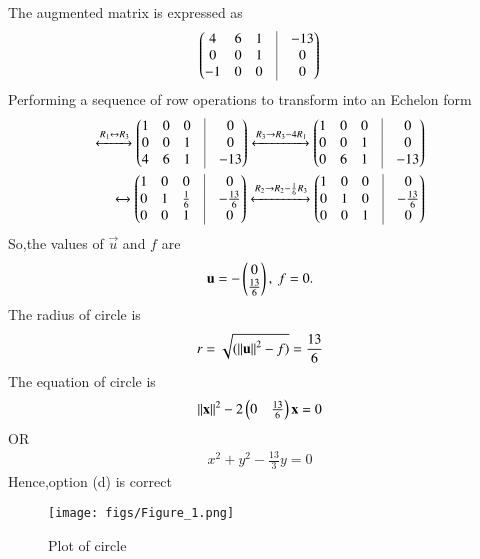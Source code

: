\documentclass[journal]{IEEEtran}
\numberwithin{equation}{enumi}
\numberwithin{figure}{enumi}
\begin{document}
The augmented matrix is expressed as
\begin{align}
	\myvec{
	        4 & 6 & 1 & \vrule & -13\\
	       0 & 0 & 1 & \vrule & 0\\
-1 & 0 & 0 & \vrule & 0}
\end{align}
Performing a sequence of row operations to transform into an Echelon form
\begin{align*}
	\xleftrightarrow[]{{R_1\leftrightarrow R_3}}
	\myvec{1 & 0 & 0 & \vrule & 0\\
	        0 &  0 & 1 & \vrule & 0\\
	        4 & 6 & 1 & \vrule & -13}
	\xleftrightarrow[]{{R_3\rightarrow R_3-4R_1}}
	\myvec{1 & 0 & 0 & \vrule & 0\\
	        0 &  0 & 1 & \vrule & 0\\
	        0 &  6 & 1 & \vrule & -13}\\
	\xleftrightarrow[]{{}}
	\myvec{ 1 & 0 & 0 & \vrule & 0\\
	        0 &  1 & \frac{1}{6} & \vrule & -\frac{13}{6}\\
	        0 &  0 & 1 & \vrule & 0}	
	\xleftrightarrow[]{{R_2\rightarrow R_2-\frac{1}{6}R_3}}
	\myvec{ 1 &  0 & 0 & \vrule & 0\\
	        0 &  1 & 0 & \vrule & -\frac{13}{6}\\
	        0 &  0 & 1 & \vrule & 0}
\end{align*}
So,the values of $\vec{u}$ and $f$ are
\begin{align}
	\mathbf{u} = -\begin{pmatrix}0\\\frac{13}{6}\end{pmatrix},\
	f = 0.
\end{align}
The radius of circle is
\begin{align}
	r=\sqrt{(\left\lVert\mathbf{u}\right\rVert^2-f)}=\frac{13}{6}
\end{align}
The equation of circle is
\begin{align}
	\left\lVert\mathbf{x}\right\rVert^2-2\begin{pmatrix}0 & \frac{13}{6}\end{pmatrix}\mathbf{x}=0
\end{align}
OR
\begin{align}
x^2+y^2-\frac{13}{3}y=0
\end{align}
Hence,option (d) is correct
\begin{figure}[h!]
   \centering
   \texttt{[image: figs/Figure\_1.png]}
   \caption{Plot of circle}
   \label{stemplot}
\end{figure}
\end{document}
